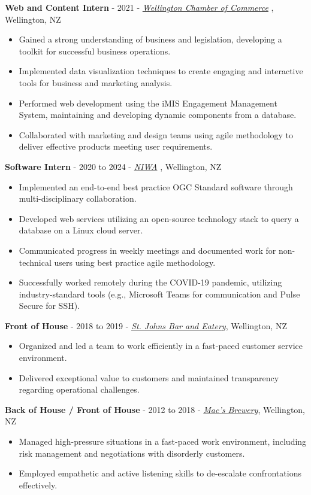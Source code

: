 \documentclass[9pt]{developercv}
\begin{document}
\textbf{Web and Content Intern} - 2021 - \emph{\href{https://www.wecc.org.nz/}{Wellington Chamber of Commerce}} , Wellington, NZ
\begin{itemize}
    \item Gained a strong understanding of business and legislation, developing a toolkit for successful business operations.
    \item Implemented data visualization techniques to create engaging and interactive tools for business and marketing analysis.
    \item Performed web development using the iMIS Engagement Management System, maintaining and developing dynamic components from a database.
    \item Collaborated with marketing and design teams using agile methodology to deliver effective products meeting user requirements.
\end{itemize}

\textbf{Software Intern} - 2020 to 2024 - \emph{\href{https://niwa.co.nz/}{NIWA}} , Wellington, NZ
\begin{itemize}
    \item Implemented an end-to-end best practice OGC Standard software through multi-disciplinary collaboration.
    \item Developed web services utilizing an open-source technology stack to query a database on a Linux cloud server.
    \item Communicated progress in weekly meetings and documented work for non-technical users using best practice agile methodology.
    \item Successfully worked remotely during the COVID-19 pandemic, utilizing industry-standard tools (e.g., Microsoft Teams for communication and Pulse Secure for SSH).
\end{itemize}

\textbf{Front of House} - 2018 to 2019 - \emph{\href{https://stjohnsbar.co.nz/}{St. Johns Bar and Eatery}}, Wellington, NZ
\begin{itemize}
    \item Organized and led a team to work efficiently in a fast-paced customer service environment.
    \item Delivered exceptional value to customers and maintained transparency regarding operational challenges.
\end{itemize}

\textbf{Back of House / Front of House} - 2012 to 2018 - \emph{\href{https://macsbrewbar.co.nz/}{Mac's Brewery}}, Wellington, NZ
\begin{itemize}
    \item Managed high-pressure situations in a fast-paced work environment, including risk management and negotiations with disorderly customers.
    \item Employed empathetic and active listening skills to de-escalate confrontations effectively.
\end{itemize}
\end{document}
